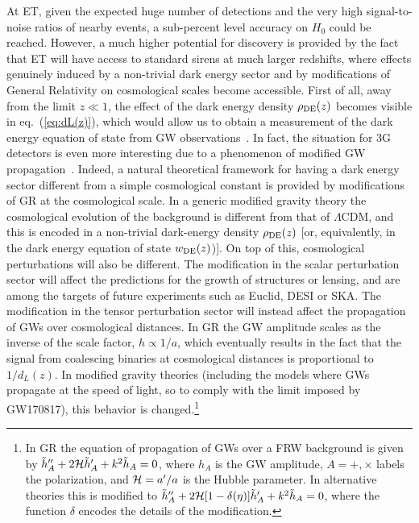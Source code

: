 At ET, given  the expected huge number of detections and the very high signal-to-noise ratios  of nearby  events, a sub-percent level accuracy on $H_0$  could be reached. However,
a much higher potential for discovery is provided by the fact
that ET will have access to standard sirens at much larger redshifts, where effects genuinely induced by a non-trivial  dark energy  sector and by modifications of General Relativity on cosmological scales  become accessible. First of all, away from the limit $z\ll 1$, the effect of  the dark energy 
density $\rho_{\rm DE}(z)$  becomes visible in eq.~(\ref{eq:dL(z)}), which would allow us to obtain a   measurement of the dark energy equation of state from GW observations~\cite{Sathyaprakash:2009xt,Zhao:2010sz,Belgacem:2018lbp}. In fact, the situation for 3G detectors is even more interesting due to a phenomenon of modified GW propagation~\cite{Saltas:2014dha,Lombriser:2015sxa,Nishizawa:2017nef,Belgacem:2017ihm,Amendola:2017ovw,Belgacem:2018lbp,Belgacem:2019pkk}. Indeed, a natural theoretical framework for having a  dark energy sector different from a simple cosmological constant is provided by modifications of GR at the cosmological scale. In a generic modified gravity theory the cosmological evolution of the background is different from that of $\Lambda$CDM, and this is encoded in a non-trivial dark-energy density $\rho_{\rm DE}(z)$
[or, equivalently, in the dark energy equation of state $w_{\rm DE}(z)$)]. On top of this, cosmological perturbations will also be different. The modification in the scalar perturbation sector  will affect the predictions for the growth of structures or lensing, and
are among the  targets of future experiments such as Euclid, DESI or SKA. The modification in the tensor perturbation sector will instead affect the propagation of GWs over cosmological distances. In GR the GW amplitude scales as the inverse of the scale factor, $h\propto 1/a$, which eventually results in the fact that the signal from coalescing binaries at cosmological distances is proportional to $1/d_L(z)$. In  modified gravity theories (including the models where GWs propagate at the speed of light, so to comply with the limit imposed by GW170817), this behavior is changed.\footnote{In GR the equation of propagation of GWs over a FRW background is given by $\tilde{h}''_A  +2 {\cal H}\tilde{h}'_A+k^2\tilde{h}_A=0$, where $h_A$ is the GW amplitude, $A=+,\times$ labels the polarization, and ${\cal H}=a'/a$ is the Hubble parameter. In alternative theories this is modified to
$\tilde{h}''_A  +2 {\cal H}[1-\delta(\eta)] \tilde{h}'_A+k^2\tilde{h}_A=0$, where the function $\delta$ encodes the details of the modification.}
